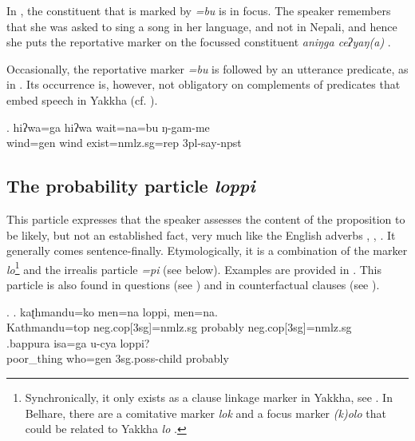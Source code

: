 In \Last[a], the constituent that is marked by \emph{=bu} is in focus. The speaker remembers that she was asked to sing a song in her language, and not in Nepali, and hence she puts the reportative marker on the focussed constituent \emph{aniŋga ceʔyaŋ(a)} .


Occasionally, the reportative marker \emph{=bu} is followed by an utterance predicate, as in \Next. Its occurrence is, however, not obligatory on complements of predicates that embed speech in Yakkha (cf. ).
 
 \exg. hiʔwa=ga hiʔwa wait=na=bu  ŋ-gam-me\\
 wind{\sc =gen} wind exist{\sc [npst;3sg]=nmlz.sg=rep} {\sc 3pl-}say{\sc -npst}\\
 


\subsection{The probability particle \emph{loppi}}

This particle expresses that the speaker assesses the content of the proposition to be likely, but not an established fact, very much like the English adverbs , , . It generally comes sentence-finally. Etymologically, it is a combination of the marker \emph{lo}\footnote{Synchronically, it only exists  as a clause linkage marker in Yakkha, see . In Belhare, there are a comitative marker \emph{lok} and a focus marker \emph{(k)olo} that could be related to Yakkha \emph{lo} \citep{Bickel2003Belhare}.} and the irrealis particle \emph{=pi} (see below). Examples are provided in \Next. This particle is also found in questions (see \Next[b]) and in counterfactual clauses (see ). 

\ex. \ag. kaʈhmandu=ko     men=na            loppi,  men=na.\\
Kathmandu{\sc =top} {\sc neg.cop[3sg]=nmlz.sg} probably  {\sc neg.cop[3sg]=nmlz.sg} \\
 
\bg.bappura  isa=ga    u-cya            loppi?\\
poor\_thing who{\sc =gen} {\sc 3sg.poss-}child probably\\
 


